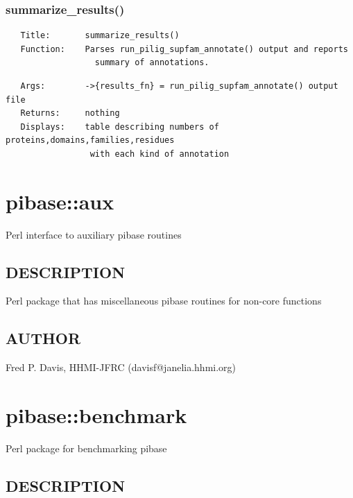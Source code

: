 \documentclass{article}
\begin{document}
\subsubsection*{summarize\_results()\label{pibase::SUPFAM_pm_summarize_results_}}
\begin{verbatim}
   Title:       summarize_results()
   Function:    Parses run_pilig_supfam_annotate() output and reports
                  summary of annotations.
\end{verbatim}
\begin{verbatim}
   Args:        ->{results_fn} = run_pilig_supfam_annotate() output file
   Returns:     nothing
   Displays:    table describing numbers of proteins,domains,families,residues
                 with each kind of annotation
\end{verbatim}
\clearpage
\section{pibase::aux\label{pibase::aux}}


Perl interface to auxiliary pibase routines

\subsection*{DESCRIPTION\label{pibase::aux_DESCRIPTION}}


Perl package that has miscellaneous pibase routines for non-core functions

\subsection*{AUTHOR\label{pibase::aux_AUTHOR}}


Fred P. Davis, HHMI-JFRC (davisf@janelia.hhmi.org)

\clearpage
\section{pibase::benchmark\label{pibase::benchmark}}


Perl package for benchmarking pibase

\subsection*{DESCRIPTION\label{pibase::benchmark_DESCRIPTION}}
\end{document}
